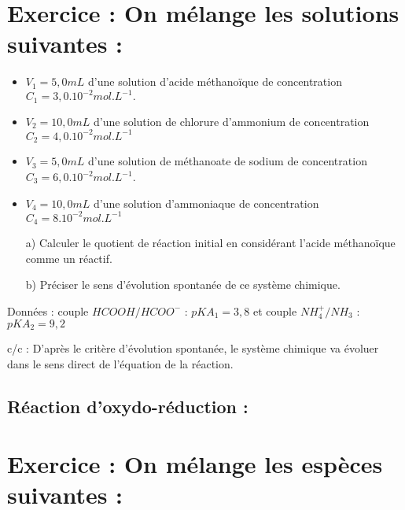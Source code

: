 \documentclass[12pt]{article}
\begin{document}
\section*{Exercice : On mélange les solutions suivantes :}

\begin{itemize}
	\item  $V_1 = 5,0 mL$ d'une solution d'acide méthanoïque de concentration $C_1 = 3,0.10^{- 2} mol.L^{-1}.$
		
	\item $V_2 = 10,0 mL$ d'une solution de chlorure d'ammonium de concentration $C_2 = 4,0.10^{-2} mol.L^{-1}$

	\item $V_3 = 5,0 mL$ d'une solution de méthanoate de sodium de concentration $C_3 = 6,0.10^{- 2} mol.L^{-1}$.

\item $V_4 = 10,0 mL$ d'une solution d'ammoniaque de concentration $C_4 = 8.10^{- 2} mol.L^{-1}$

\item[a)] Calculer le quotient de réaction initial en considérant l'acide méthanoïque comme un réactif.
\item[b)] Préciser le sens d'évolution spontanée de ce système chimique.
\end{itemize}

Données : couple $HCOOH / HCOO^-$ : $pKA_1 = 3,8$ et couple $NH_4^+/NH_3$ : $pKA_2 = 9,2$

c/c : D'après le critère d'évolution spontanée, le système chimique va évoluer dans le sens direct de
l'équation de la réaction.

\subsection{Réaction d'oxydo-réduction :}

\section*{Exercice : On mélange les espèces suivantes :}
\end{document}
